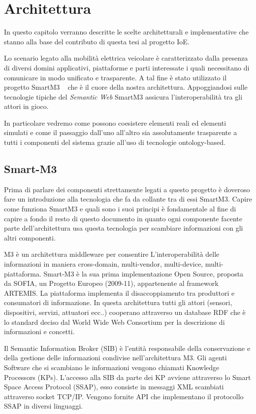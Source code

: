 \chapter{Architettura}

In questo capitolo verranno descritte le scelte architetturali e implementative che stanno alla base del contributo di questa tesi al progetto IoE. 

Lo scenario legato alla mobilità elettrica veicolare è caratterizzato dalla presenza di diversi domini applicativi, piattaforme e parti interessate i quali necessitano di comunicare in modo unificato e trasparente. A tal fine è stato utilizzato il progetto SmartM3 ~\cite{tullio2011} che è il cuore della nostra architettura. Appoggiandosi sulle tecnologie tipiche del \emph{Semantic Web} SmartM3 assicura l'interoperabilità tra gli attori in gioco. 

In particolare vedremo come possono coesistere elementi reali ed elementi simulati e come il passaggio dall'uno all'altro sia assolutamente trasparente a tutti i componenti del sistema grazie all'uso di tecnologie ontology-based.

\section{Smart-M3}

Prima di parlare dei componenti strettamente legati a questo progetto è doveroso fare un introduzione alla tecnologia che fa da collante tra di essi SmartM3. Capire come funziona SmartM3 e quali sono i suoi principi è fondamentale al fine di capire a fondo il resto di questo documento in quanto ogni componente facente parte dell'architettura usa questa tecnologia per scambiare informazioni con gli altri componenti.

M3 è un architettura middleware per consentire L'interoperabilità delle informazioni in maniera cross-domain, multi-vendor, multi-device, multi-piattaforma. Smart-M3 è la sua prima implementazione Open Source, proposta da SOFIA, un Progetto Europeo (2009-11), appartenente al framework ARTEMIS. 
La piattaforma implementa il disaccoppiamento tra produttori e consumatori di informazione. In questa architettura tutti gli attori (sensori, dispositivi, servizi, attuatori ecc..) cooperano attraverso un database RDF che è lo standard deciso dal World Wide Web Consortium per la descrizione di informazioni e concetti.

Il Semantic Information Broker (SIB) è l'entità responsabile della conservazione e della gestione delle informazioni condivise nell'architettura M3. Gli agenti Software che si scambiano le informazioni vengono chiamati Knowledge Processors (KPs). L'accesso alla SIB da parte dei KP avviene attraverso lo Smart Space Access Protocol  (SSAP), esso consiste in messaggi XML scambiati attraverso socket TCP/IP. Vengono fornite API che implementano il protocollo SSAP in diversi linguaggi.

